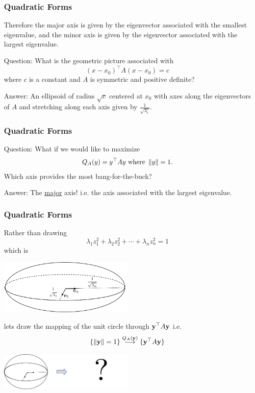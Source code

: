 \documentclass{beamer}
\begin{document}
\begin{frame}\frametitle{Quadratic Forms}
	Therefore the major axis is given by the eigenvector associated with the smallest eigenvalue, and the minor axis is given by the eigenvector associated with the largest eigenvalue.
	
	\vfill
	
	{\color{blue} Question:}  What is the geometric picture associated with
	\[
		(x-x_0)^\top A(x - x_0) = c 
	\]
	where $c$ is a constant and $A$ is symmetric and positive definite?
	
	\vfill
	
	{\color{blue} Answer:}  An ellipsoid of radius $\sqrt{c}$ centered at $x_0$ with axes along the eigenvectors of $A$ and stretching along each axis given by $\displaystyle \frac{1}{\sqrt{\lambda_i}}$.
\end{frame}

\begin{frame}\frametitle{Quadratic Forms}
	{\color{blue}Question:}  
	What if we would like to maximize
	\[ 
		Q_A(y) = y^\top Ay \text{ where } \left\|y\right\| = 1.
	\]
	Which axis provides the most bang-for-the-buck?
	
	\vfill
	
	{\color{blue}Answer:} The \underline{major} axis!  i.e. the axis associated with the largest eigenvalue.
	
\end{frame}

\begin{frame}\frametitle{Quadratic Forms}
	Rather than drawing
	\[ 
		\lambda_1 z_1^2 + \lambda_2 z_2^2 + \cdots + \lambda_n z_n^2 = 1 
	\]
	which is
	\begin{center}
		\includegraphics[width=0.5\textwidth]{figures/chap6_quadratic_form_1}
	\end{center}
	lets draw the mapping of the unit circle through $\mathbf{y}^\top A\mathbf{y}$
	i.e.
	\[ 
		\{ \left\|\mathbf{y}\right\|=1 \} 
			\overset{Q_A(\mathbf{y})}{\longrightarrow} 
		\{ \mathbf{y}^\top A \mathbf{y} \}
	\]
	\begin{center}
		\includegraphics[width=0.5\textwidth]
			{figures/chap6_mapping_1}
	\end{center}
\end{frame}
\end{document}

